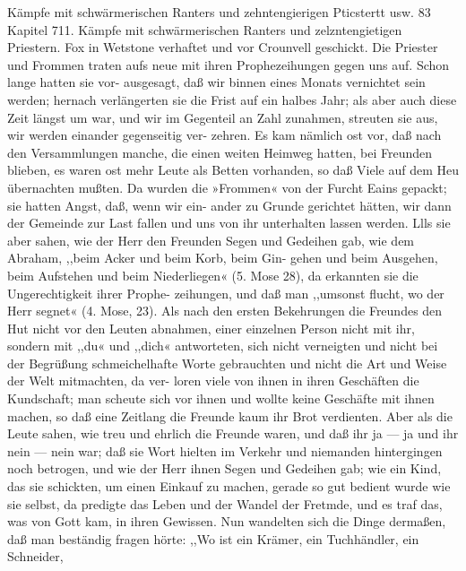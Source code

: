 Kämpfe mit schwärmerischen Ranters und zehntengierigen Pticstertt usw. 83
Kapitel 711.
Kämpfe mit schwärmerischen Ranters und zelzntengietigen Priestern.
Fox in Wetstone verhaftet und vor Crounvell geschickt.
Die Priester und Frommen traten aufs neue mit ihren
Prophezeihungen gegen uns auf. Schon lange hatten sie vor-
ausgesagt, daß wir binnen eines Monats vernichtet sein werden;
hernach verlängerten sie die Frist auf ein halbes Jahr; als aber
auch diese Zeit längst um war, und wir im Gegenteil an Zahl
zunahmen, streuten sie aus, wir werden einander gegenseitig ver-
zehren. Es kam nämlich ost vor, daß nach den Versammlungen
manche, die einen weiten Heimweg hatten, bei Freunden blieben,
es waren ost mehr Leute als Betten vorhanden, so daß Viele auf
dem Heu übernachten mußten. Da wurden die »Frommen« von
der Furcht Eains gepackt; sie hatten Angst, daß, wenn wir ein-
ander zu Grunde gerichtet hätten, wir dann der Gemeinde zur
Last fallen und uns von ihr unterhalten lassen werden. Llls sie
aber sahen, wie der Herr den Freunden Segen und Gedeihen
gab, wie dem Abraham, ,,beim Acker und beim Korb, beim Gin-
gehen und beim Ausgehen, beim Aufstehen und beim Niederliegen«
(5. Mose 28), da erkannten sie die Ungerechtigkeit ihrer Prophe-
zeihungen, und daß man ,,umsonst flucht, wo der Herr segnet«
(4. Mose, 23). Als nach den ersten Bekehrungen die Freundes
den Hut nicht vor den Leuten abnahmen, einer einzelnen Person
nicht mit ihr, sondern mit ,,du« und ,,dich« antworteten, sich nicht
verneigten und nicht bei der Begrüßung schmeichelhafte Worte
gebrauchten und nicht die Art und Weise der Welt mitmachten, da ver-
loren viele von ihnen in ihren Geschäften die Kundschaft; man
scheute sich vor ihnen und wollte keine Geschäfte mit ihnen machen,
so daß eine Zeitlang die Freunde kaum ihr Brot verdienten. Aber
als die Leute sahen, wie treu und ehrlich die Freunde waren,
und daß ihr ja — ja und ihr nein — nein war; daß sie Wort hielten
im Verkehr und niemanden hintergingen noch betrogen, und wie
der Herr ihnen Segen und Gedeihen gab; wie ein Kind, das sie
schickten, um einen Einkauf zu machen, gerade so gut bedient
wurde wie sie selbst, da predigte das Leben und der Wandel der
Fretmde, und es traf das, was von Gott kam, in ihren Gewissen.
Nun wandelten sich die Dinge dermaßen, daß man beständig
fragen hörte: ,,Wo ist ein Krämer, ein Tuchhändler, ein Schneider,
 


